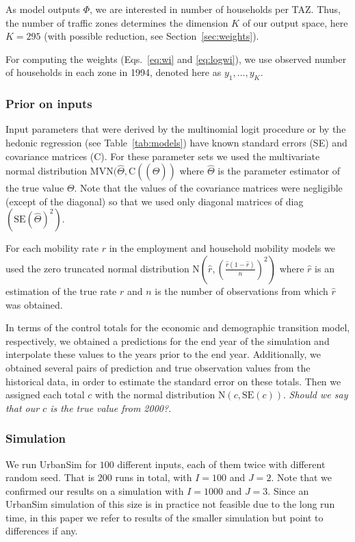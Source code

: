 \documentclass[11pt, fleqn]{article}
\begin{document}
As model outputs $\Phi$, we are interested in number of households per TAZ.
Thus, the number of traffic zones determines the dimension $K$ of our output
space, here $K=295$ (with possible reduction, see Section~\ref{sec:weights}).

For computing the weights (Eqs.~\ref{eq:wi} and \ref{eq:logwi}), we use
observed number of households in each zone in 1994, denoted here as
$y_1,\dots,y_K$.

%
\subsubsection{Prior on inputs}
%
Input parameters that were derived by the multinomial logit procedure or by
the hedonic regression (see Table~\ref{tab:models}) have known standard errors
(SE) and covariance matrices (C).  For these parameter sets we used the
multivariate normal distribution MVN$(\hat{\Theta},\text{C}((\hat{\Theta}))$
where $\hat{\Theta}$ is the parameter estimator of the true value $\Theta$.
Note that the values of the covariance matrices were negligible (except of the
diagonal) so that we used only diagonal matrices of
diag$(\text{SE}(\hat{\Theta})^2)$. 

For each mobility rate $r$ in the employment and household mobility models we
used the zero truncated normal distribution N$(\hat{r},
(\frac{\hat{r}(1-\hat{r})}{n})^2)$ where $\hat{r}$ is an estimation of the
true rate $r$ and $n$ is the number of observations from which $\hat{r}$ was
obtained.

In terms of the control totals for the economic and demographic transition
model, respectively, we obtained a predictions for the end year of the
simulation and interpolate these values to the years prior to the end year.
Additionally, we obtained several pairs of prediction and true observation
values from the historical data, in order to estimate the standard error on
these totals. Then we assigned each total $c$ with the normal distribution
N$(c,\text{SE}(c))$. {\em Should we say that our $c$ is the true value from
  2000?}.

\subsubsection{Simulation}
%
We run UrbanSim for $100$ different inputs, each of them twice with different
random seed.  That is $200$ runs in total, with $I=100$ and $J=2$. Note that
we confirmed our results on a simulation with $I=1000$ and $J=3$. Since an
UrbanSim simulation of this size is in practice not feasible due to the long
run time, in this paper we refer to results of the smaller simulation but
point to differences if any.
\end{document}
